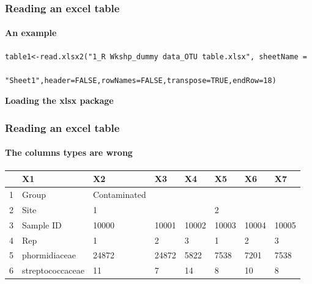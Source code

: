 \documentclass[10pt,handout,english]{beamer}\usepackage[]{graphicx}\usepackage[]{color}
\makeatletter
\newenvironment{kframe}{%
 \def\at@end@of@kframe{}%
 \ifinner\ifhmode%
  \def\at@end@of@kframe{\end{minipage}}%
  \begin{minipage}{\columnwidth}%
 \fi\fi%
 \def\FrameCommand##1{\hskip\@totalleftmargin \hskip-\fboxsep
 \colorbox{shadecolor}{##1}\hskip-\fboxsep
     \hskip-\linewidth \hskip-\@totalleftmargin \hskip\columnwidth}%
 \MakeFramed {\advance\hsize-\width
   \@totalleftmargin\z@ \linewidth\hsize
   \@setminipage}}%
 {\par\unskip\endMakeFramed%
 \at@end@of@kframe}
\newenvironment{knitrout}{}{} %
\makeatother
\begin{document}
\begin{frame}[fragile]
  \frametitle{Reading an excel table}
  \framesubtitle{An example}
\begin{lstlisting} 
table1<-read.xlsx2("1_R Wkshp_dummy data_OTU table.xlsx", sheetName = 

"Sheet1",header=FALSE,rowNames=FALSE,transpose=TRUE,endRow=18)
\end{lstlisting}
{\bf Loading the xlsx package}  
\begin{knitrout}
\color{fgcolor}\begin{kframe}


{\ttfamily\noindent\itshape\color{messagecolor}{\#\# Loading required package: xlsx}}

{\ttfamily\noindent\color{warningcolor}{\#\# Warning: package 'xlsx' was built under R version 3.1.3}}

{\ttfamily\noindent\itshape\color{messagecolor}{\#\# Loading required package: rJava}}

{\ttfamily\noindent\color{warningcolor}{\#\# Warning: package 'rJava' was built under R version 3.1.3}}

{\ttfamily\noindent\itshape\color{messagecolor}{\#\# Loading required package: methods\\\#\# Loading required package: xlsxjars\\\#\# Loading required package: xtable}}\end{kframe}
\end{knitrout}
\end{frame}
\begin{frame}[fragile]
  \frametitle{Reading an excel table}
  \framesubtitle{The columns types are wrong}
\begin{table}[ht]
\centering
\begin{tabular}{rlllllll}
  \hline
 & X1 & X2 & X3 & X4 & X5 & X6 & X7 \\ 
  \hline
1 & Group & Contaminated &  &  &  &  &  \\ 
  2 & Site & 1 &  &  & 2 &  &  \\ 
  3 & Sample ID & 10000 & 10001 & 10002 & 10003 & 10004 & 10005 \\ 
  4 & Rep & 1 & 2 & 3 & 1 & 2 & 3 \\ 
  5 & phormidiaceae & 24872 & 24872 & 5822 & 7538 & 7201 & 7538 \\ 
  6 & streptococcaceae & 11 & 7 & 14 & 8 & 10 & 8 \\ 
   \hline
\end{tabular}
\end{table}

\clearpage
\end{frame}
\end{document}
